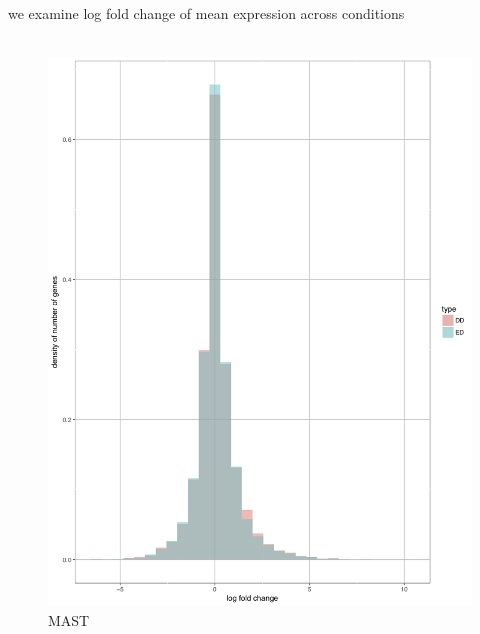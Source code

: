 \documentclass[11pt]{amsart}
\begin{document}
\newpage 
we examine log fold change of mean expression across conditions\\
\\
\begin{figure}[H]
  \includegraphics[width=\linewidth]{DEC_NPC_mast.png}
  \caption{MAST}
\endminipage\hfill
{}

\end{figure}
\end{document}
